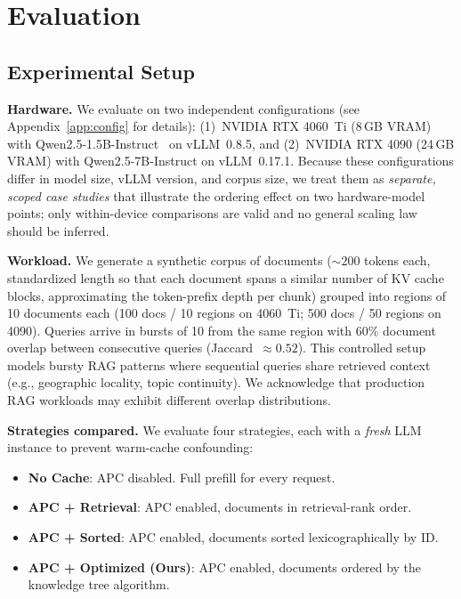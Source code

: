 \documentclass{article}
\begin{document}
\section{Evaluation}
\label{sec:eval}

\subsection{Experimental Setup}

\textbf{Hardware.} We evaluate on two independent configurations (see Appendix~\ref{app:config} for details): (1)~NVIDIA RTX 4060~Ti (8\,GB VRAM) with Qwen2.5-1.5B-Instruct~\citep{qwen2.5} on vLLM~0.8.5, and (2)~NVIDIA RTX 4090 (24\,GB VRAM) with Qwen2.5-7B-Instruct on vLLM~0.17.1. Because these configurations differ in model size, vLLM version, and corpus size, we treat them as \emph{separate, scoped case studies} that illustrate the ordering effect on two hardware-model points; only within-device comparisons are valid and no general scaling law should be inferred.

\textbf{Workload.} We generate a synthetic corpus of documents (${\sim}200$ tokens each, standardized length so that each document spans a similar number of KV cache blocks, approximating the token-prefix depth per chunk) grouped into regions of 10 documents each (100 docs / 10 regions on 4060~Ti; 500 docs / 50 regions on 4090). Queries arrive in bursts of 10 from the same region with 60\% document overlap between consecutive queries (Jaccard~$\approx 0.52$). This controlled setup models bursty RAG patterns where sequential queries share retrieved context (e.g., geographic locality, topic continuity). We acknowledge that production RAG workloads may exhibit different overlap distributions.

\textbf{Strategies compared.} We evaluate four strategies, each with a \emph{fresh} LLM instance to prevent warm-cache confounding:
\begin{itemize}
\item \textbf{No Cache}: APC disabled. Full prefill for every request.
\item \textbf{APC + Retrieval}: APC enabled, documents in retrieval-rank order.
\item \textbf{APC + Sorted}: APC enabled, documents sorted lexicographically by ID.
\item \textbf{APC + Optimized (Ours)}: APC enabled, documents ordered by the knowledge tree algorithm.
\end{itemize}
\end{document}
